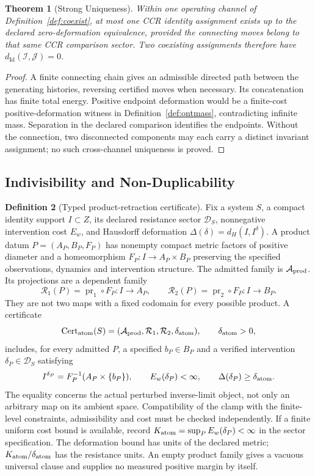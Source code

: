 \documentclass[11pt,a4paper]{article}
\theoremstyle{plain}
\newtheorem{theorem}{Theorem}[section]
\theoremstyle{definition}
\newtheorem{definition}[theorem]{Definition}
\theoremstyle{remark}
\begin{document}
\begin{theorem}[Strong Uniqueness]\label{thm:uniqueness}
Within one operating channel of Definition~\ref{def:coexist}, at most one CCR identity assignment exists up to the declared zero-deformation equivalence, provided the connecting moves belong to that same CCR comparison sector. Two coexisting assignments therefore have $d_{\mathrm{Id}}(\mathcal I,\mathcal J)=0$.
\end{theorem}
\begin{proof}
A finite connecting chain gives an admissible directed path between the generating histories, reversing certified moves when necessary. Its concatenation has finite total energy. Positive endpoint deformation would be a finite-cost positive-deformation witness in Definition~\ref{def:ontmass}, contradicting infinite mass. Separation in the declared comparison identifies the endpoints. Without the connection, two disconnected components may each carry a distinct invariant assignment; no such cross-channel uniqueness is proved.
\end{proof}

\subsection{Indivisibility and Non-Duplicability}

\begin{definition}[Typed product-retraction certificate]\label{def:atomicity-certificate}
Fix a system $S$, a compact identity support $I\subset Z$, its declared resistance sector $\mathcal D_S$, nonnegative intervention cost $E_w$, and Hausdorff deformation $\Delta(\delta)=d_H(I,I^\delta)$. A product datum $P=(A_P,B_P,F_P)$ has nonempty compact metric factors of positive diameter and a homeomorphism $F_P:I\to A_P\times B_P$ preserving the specified observations, dynamics and intervention structure. The admitted family is $\mathcal A_{\rm prod}$. Its projections are a dependent family
\[
 \mathcal R_1(P)=\operatorname{pr}_1\circ F_P:I\to A_P,
 \qquad \mathcal R_2(P)=\operatorname{pr}_2\circ F_P:I\to B_P.
\]
They are not two maps with a fixed codomain for every possible product. A certificate
\[
 \mathrm{Cert}_{\rm atom}(S)=
 (\mathcal A_{\rm prod},\mathcal R_1,\mathcal R_2,\delta_{\rm atom}),
 \qquad \delta_{\rm atom}>0,
\]
includes, for every admitted $P$, a specified $b_P\in B_P$ and a verified intervention $\delta_P\in\mathcal D_S$ satisfying
\[
 I^{\delta_P}=F_P^{-1}(A_P\times\{b_P\}),\qquad
 E_w(\delta_P)<\infty,\qquad
 \Delta(\delta_P)\ge\delta_{\rm atom}.
\]
The equality concerns the actual perturbed inverse-limit object, not only an arbitrary map on its ambient space. Compatibility of the clamp with the finite-level constraints, admissibility and cost must be checked independently. If a finite uniform cost bound is available, record $K_{\rm atom}=\sup_P E_w(\delta_P)<\infty$ in the sector specification. The deformation bound has units of the declared metric; $K_{\rm atom}/\delta_{\rm atom}$ has the resistance units. An empty product family gives a vacuous universal clause and supplies no measured positive margin by itself.
\end{definition}
\end{document}
